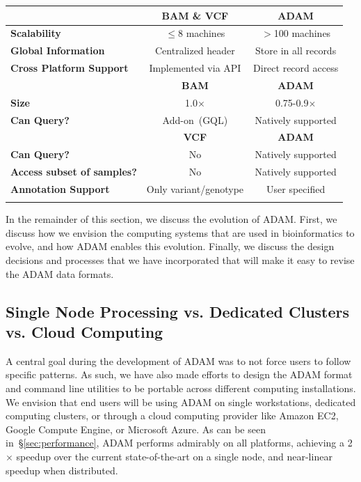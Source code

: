 \documentclass{bioinfo}
\begin{document}
\begin{table}[h]
{\begin{tabular}{ l c c }
\toprule
 & \bf BAM \& VCF & \bf ADAM \\
\midrule
\bf Scalability & $\le$8 machines & $>$100 machines \\
\bf Global Information & Centralized header & Store in all records \\
\bf Cross Platform Support & Implemented via API & Direct record access \\
\midrule
 & \bf BAM & \bf ADAM \\
\midrule
\bf Size & 1.0$\times$ & 0.75-0.9$\times$ \\
\bf Can Query? & Add-on~(GQL) & Natively supported \\ 
\midrule
& \bf VCF & \bf ADAM \\
\midrule
\bf Can Query? & No & Natively supported \\ 
\bf Access subset of samples? & No & Natively supported \\
\bf Annotation Support & Only variant/genotype & User specified \\
\botrule
\end{tabular}}{}
\end{table}

In the remainder of this section, we discuss the evolution of ADAM. First, we discuss how we envision the computing systems that are used in bioinformatics to evolve, and
how ADAM enables this evolution. Finally, we discuss the design decisions and processes that we have incorporated that will make it easy to revise the ADAM data formats.

\subsection{Single Node Processing vs. Dedicated Clusters vs. Cloud Computing}
\label{sec:single-vs-clusters-vs-cloud}

A central goal during the development of ADAM was to not force users to follow specific patterns. As such, we have also made efforts to design the ADAM format and command
line utilities to be portable across different computing installations. We envision that end users will be using ADAM on single workstations, dedicated computing
clusters, or through a cloud computing provider like Amazon EC2, Google Compute Engine, or Microsoft Azure. As can be seen in~\S\ref{sec:performance}, ADAM performs
admirably on all platforms, achieving a 2$\times$ speedup over the current state-of-the-art on a single node, and near-linear speedup when distributed.
\end{document}
